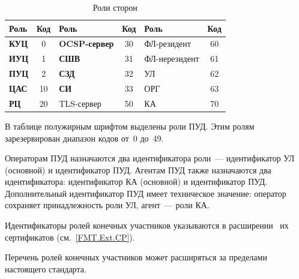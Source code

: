 \begin{table}[hbt]
\caption{Роли сторон}
\label{Table.ENTITIES.Roles}
\begin{tabular}{|l|c||l|c||l|c|}
\hline
Роль & Код & Роль & Код & Роль & Код\\
\hline
\hline
{\bf КУЦ} & 0   & {\bf OCSP-сервер} & 30  & ФЛ-резидент    & 60\\
{\bf ИУЦ} & 1   & {\bf СШВ}         & 31  & ФЛ-нерезидент  & 61\\
{\bf ПУЦ} & 2   & {\bf СЗД}         & 32  & УЛ             & 62\\
{\bf ЦАС} & 10  & {\bf СИ}          & 33  & ОРГ            & 63\\
{\bf РЦ}  & 20  & TLS-сервер        & 50  & КА             & 70\\
\hline
\end{tabular}
\end{table}

В таблице полужирным шрифтом выделены роли ПУД. Этим ролям зарезервирован 
диапазон кодов от~0 до~49.

Операторам ПУД назначаются два идентификатора роли~--- идентификатор УЛ 
(основной) и идентификатор ПУД.
%
Агентам ПУД также назначаются два идентификатора: идентификатор КА (основной) 
и идентификатор ПУД.
%
Дополнительный идентификатор ПУД имеет техническое значение: оператор сохраняет 
принадлежность роли УЛ, агент~--- роли КА. 

Идентификаторы ролей конечных участников указываются в 
расширении~ их сертификатов
(см.~\ref{FMT.Ext.CP}).

Перечень ролей конечных участников может расширяться за пределами настоящего 
стандарта.

